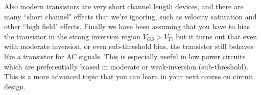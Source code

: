 Also modern transistors are very short channel length devices, and there are many ``short channel" effects that we're ignoring, such as velocity saturation and other ``high field" effects.  Finally we have been assuming that you have to bias the transistor in the strong inversion region $V_{GS} > V_T$, but it turns out that even with moderate inversion, or even sub-threshold bias, the transistor still behaves like a transistor for AC signals.  This is especially useful in low power circuits which are preferentially biased in moderate or weak-inversion (sub-threshold).  This is a more advanced topic that you can learn in your next course on circuit design.  


 


